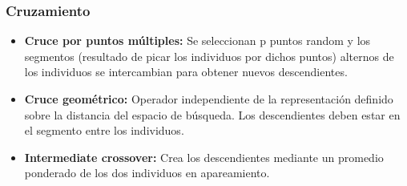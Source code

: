 \documentclass[twoside,twocolumn]{article} %
\begin{document}
	\subsubsection{Cruzamiento}
	
	\begin{itemize}
		\item  \textbf{Cruce por puntos m\'ultiples:} Se seleccionan p puntos random y los segmentos (resultado de picar los individuos por dichos puntos) alternos de los individuos se intercambian para obtener nuevos descendientes.
		\item \textbf{Cruce geom\'etrico:} Operador independiente de la representación definido sobre la distancia del espacio de búsqueda. Los descendientes deben estar en el segmento entre los individuos.
		\item \textbf{Intermediate crossover:} Crea los descendientes mediante un promedio ponderado de los dos individuos en apareamiento.
	\end{itemize}
	
	
\end{document}
